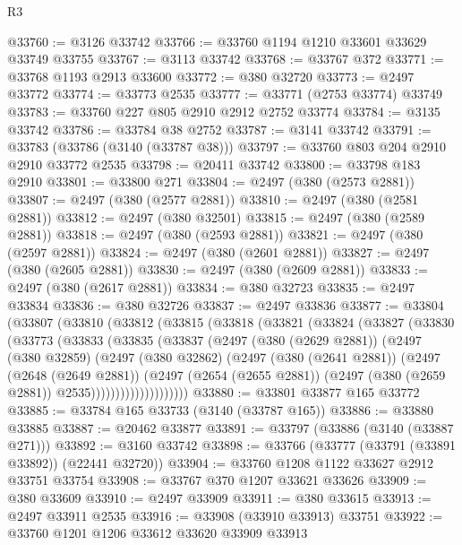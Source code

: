 \begin{lexlean}{R3}
\begin{coremodule}
@33760 := @3126 @33742
@33766 := @33760 @1194 @1210 @33601 @33629 @33749 @33755
@33767 := @3113 @33742
@33768 := @33767 @372
@33771 := @33768 @1193 @2913 @33600
@33772 := @380 @32720
@33773 := @2497 @33772
@33774 := @33773 @2535
@33777 := @33771 (@2753 @33774) @33749
@33783 := @33760 @227 @805 @2910 @2912 @2752 @33774
@33784 := @3135 @33742
@33786 := @33784 @38 @2752
@33787 := @3141 @33742
@33791 := @33783 (@33786 (@3140 (@33787 @38)))
@33797 := @33760 @803 @204 @2910 @2910 @33772 @2535
@33798 := @20411 @33742
@33800 := @33798 @183 @2910
@33801 := @33800 @271
@33804 := @2497 (@380 (@2573 @2881))
@33807 := @2497 (@380 (@2577 @2881))
@33810 := @2497 (@380 (@2581 @2881))
@33812 := @2497 (@380 @32501)
@33815 := @2497 (@380 (@2589 @2881))
@33818 := @2497 (@380 (@2593 @2881))
@33821 := @2497 (@380 (@2597 @2881))
@33824 := @2497 (@380 (@2601 @2881))
@33827 := @2497 (@380 (@2605 @2881))
@33830 := @2497 (@380 (@2609 @2881))
@33833 := @2497 (@380 (@2617 @2881))
@33834 := @380 @32723
@33835 := @2497 @33834
@33836 := @380 @32726
@33837 := @2497 @33836
@33877 := @33804
    (@33807
      (@33810
        (@33812
          (@33815
            (@33818
              (@33821
                (@33824
                  (@33827
                    (@33830
                      (@33773
                        (@33833
                          (@33835
                            (@33837
                              (@2497
                                (@380 (@2629 @2881))
                                (@2497
                                  (@380 @32859)
                                  (@2497
                                    (@380 @32862)
                                    (@2497
                                      (@380 (@2641 @2881))
                                      (@2497
                                        (@2648 (@2649 @2881))
                                        (@2497
                                          (@2654 (@2655 @2881))
                                          (@2497 (@380 (@2659 @2881)) @2535))))))))))))))))))))
@33880 := @33801 @33877 @165 @33772
@33885 := @33784 @165 @33733 (@3140 (@33787 @165))
@33886 := @33880 @33885
@33887 := @20462 @33877
@33891 := @33797 (@33886 (@3140 (@33887 @271)))
@33892 := @3160 @33742
@33898 := @33766 (@33777 (@33791 (@33891 @33892)) (@22441 @32720))
@33904 := @33760 @1208 @1122 @33627 @2912 @33751 @33754
@33908 := @33767 @370 @1207 @33621 @33626
@33909 := @380 @33609
@33910 := @2497 @33909
@33911 := @380 @33615
@33913 := @2497 @33911 @2535
@33916 := @33908 (@33910 @33913) @33751
@33922 := @33760 @1201 @1206 @33612 @33620 @33909 @33913

\end{coremodule}
\end{lexlean}
